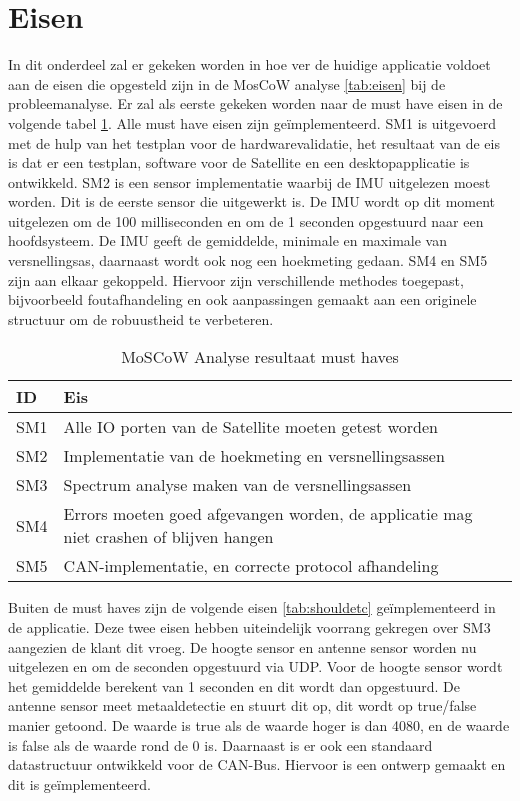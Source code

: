 \section{Eisen}
In dit onderdeel zal er gekeken worden in hoe ver de huidige applicatie voldoet aan de eisen die opgesteld zijn in de MosCoW analyse \ref{tab:eisen} bij de probleemanalyse. Er zal als eerste gekeken worden naar de must have eisen in de volgende tabel \ref{tab:must}. Alle must have eisen zijn geïmplementeerd. SM1 is uitgevoerd met de hulp van het testplan voor de hardwarevalidatie, het resultaat van de eis is dat er een testplan, software voor de Satellite en een desktopapplicatie is ontwikkeld. SM2 is een sensor implementatie waarbij de IMU uitgelezen moest worden. Dit is de eerste sensor die uitgewerkt is. De IMU wordt op dit moment uitgelezen om de 100 milliseconden en om de 1 seconden opgestuurd naar een hoofdsysteem. De IMU geeft de gemiddelde, minimale en maximale van versnellingsas, daarnaast wordt ook nog een hoekmeting gedaan. SM4 en SM5 zijn aan elkaar gekoppeld. Hiervoor zijn verschillende methodes toegepast, bijvoorbeeld foutafhandeling en ook aanpassingen gemaakt aan een originele structuur om de robuustheid te verbeteren. 

\begin{table}[h!]
	\centering
	\caption{MoSCoW Analyse resultaat must haves}
	\label{tab:must}
	\begin{tabular}{lp{15cm}}
	\toprule
	\textbf{ID} & \textbf{Eis} \\ \midrule
	SM1			& Alle IO porten van de Satellite moeten getest worden 										\\
	SM2			& Implementatie van de hoekmeting en versnellingsassen 										\\ 
	SM3			& Spectrum analyse maken van de versnellingsassen 											\\ 
	SM4			& Errors moeten goed afgevangen worden, de applicatie mag niet crashen of blijven hangen 	\\ 
	SM5			& CAN-implementatie, en correcte protocol afhandeling										\\ \bottomrule
	\end{tabular}
\end{table}

\noindent Buiten de must haves zijn de volgende eisen \ref{tab:shouldetc} geïmplementeerd in de applicatie. Deze twee eisen hebben uiteindelijk voorrang gekregen over SM3 aangezien de klant dit vroeg. De hoogte sensor en antenne sensor worden nu uitgelezen en om de seconden opgestuurd via UDP. Voor de hoogte sensor wordt het gemiddelde berekent van 1 seconden en dit wordt dan opgestuurd. De antenne sensor meet metaaldetectie en stuurt dit op, dit wordt op true/false manier getoond. De waarde is true als de waarde hoger is dan 4080, en de waarde is false als de waarde rond de 0 is. Daarnaast is er ook een standaard datastructuur ontwikkeld voor de CAN-Bus. Hiervoor is een ontwerp gemaakt en dit is geïmplementeerd. 

